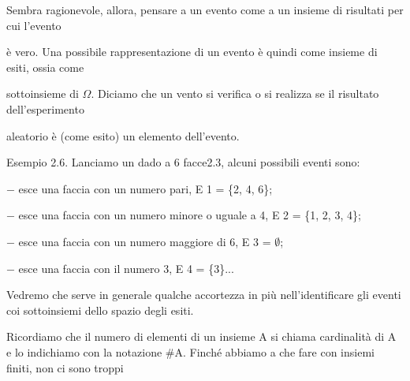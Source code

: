 \documentclass[a4paper,portrait,12pt]{article}
\begin{document}
\begin{flushleft}
Sembra ragionevole, allora, pensare a un evento come a un insieme di risultati per cui l'evento
\end{flushleft}


\begin{flushleft}
\`{e} vero. Una possibile rappresentazione di un evento \`{e} quindi come insieme di esiti, ossia come
\end{flushleft}


\begin{flushleft}
sottoinsieme di $\Omega$. Diciamo che un vento si verifica o si realizza se il risultato dell'esperimento
\end{flushleft}


\begin{flushleft}
aleatorio \`{e} (come esito) un elemento dell'evento.
\end{flushleft}


\begin{flushleft}
Esempio 2.6. Lanciamo un dado a 6 facce2.3, alcuni possibili eventi sono:
\end{flushleft}


\begin{flushleft}
$-$ esce una faccia con un numero pari, E 1 = \{2, 4, 6\};
\end{flushleft}


\begin{flushleft}
$-$ esce una faccia con un numero minore o uguale a 4, E 2 = \{1, 2, 3, 4\};
\end{flushleft}


\begin{flushleft}
$-$ esce una faccia con un numero maggiore di 6, E 3 = $\emptyset$;
\end{flushleft}


\begin{flushleft}
$-$ esce una faccia con il numero 3, E 4 = \{3\}...
\end{flushleft}


\begin{flushleft}
Vedremo che serve in generale qualche accortezza in più nell'identificare gli eventi coi sottoinsiemi dello spazio degli esiti.
\end{flushleft}


\begin{flushleft}
Ricordiamo che il numero di elementi di un insieme A si chiama cardinalit\`{a} di A e lo indichiamo con la notazione \#A. Finch\'{e} abbiamo a che fare con insiemi finiti, non ci sono troppi
\end{flushleft}
\end{document}
